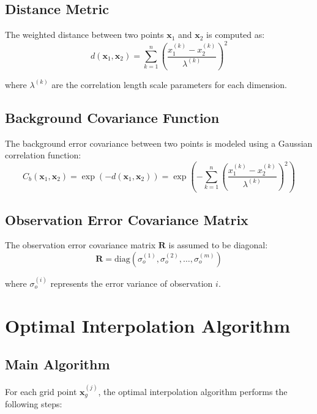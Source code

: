 \documentclass[11pt]{article}
\begin{document}
\subsection{Distance Metric}

The weighted distance between two points $\mathbf{x}_1$ and $\mathbf{x}_2$ is computed as:
\begin{equation}
d(\mathbf{x}_1, \mathbf{x}_2) = \sum_{k=1}^{n} \left(\frac{x_1^{(k)} - x_2^{(k)}}{\lambda^{(k)}}\right)^2
\end{equation}

where $\lambda^{(k)}$ are the correlation length scale parameters for each dimension.

\subsection{Background Covariance Function}

The background error covariance between two points is modeled using a Gaussian correlation function:
\begin{equation}
C_b(\mathbf{x}_1, \mathbf{x}_2) = \exp\left(-d(\mathbf{x}_1, \mathbf{x}_2)\right) = \exp\left(-\sum_{k=1}^{n} \left(\frac{x_1^{(k)} - x_2^{(k)}}{\lambda^{(k)}}\right)^2\right)
\end{equation}

\subsection{Observation Error Covariance Matrix}

The observation error covariance matrix $\mathbf{R}$ is assumed to be diagonal:
\begin{equation}
\mathbf{R} = \text{diag}(\sigma_o^{(1)}, \sigma_o^{(2)}, \ldots, \sigma_o^{(m)})
\end{equation}

where $\sigma_o^{(i)}$ represents the error variance of observation $i$.

\section{Optimal Interpolation Algorithm}

\subsection{Main Algorithm}

For each grid point $\mathbf{x}_g^{(j)}$, the optimal interpolation algorithm performs the following steps:
\end{document}
